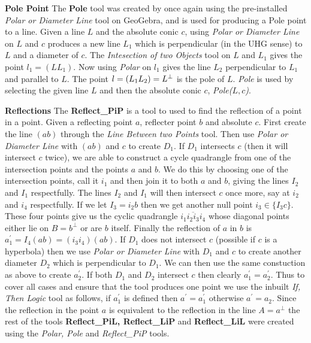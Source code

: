 \documentclass{unswthesis}
\begin{document}
\textbf{Pole Point}\newline
The \textbf{Pole} tool was created by once again using the pre-installed 
\textit{Polar or Diameter Line} tool on GeoGebra, and is used for producing
a Pole point to a line. Given a line $L$ and the absolute conic $c$, using 
\textit{Polar or Diameter Line} on $L$ and $c$ produces a new line $L_{1}$
which is perpendicular (in the UHG sense) to $L$ and a diameter of $c$. The 
\textit{Intesection of two Objects} tool on $L$ and $L_{1}$ gives the point $%
l_{1}=(LL_{1})$. Now using \textit{Polar} on $l_{1}$ gives the line $L_{2}$
perpendicular to $L_{1}$ and parallel to $L$. The point $l=(L_{1}L_{2})=L^{%
\perp}$ is the pole of $L$.\newline
\textit{Pole} is used by selecting the given line $L$ and then the absolute
conic $c$, \textit{Pole($L,c$)}.\newline

\textbf{Reflections}\newline
The \textbf{Reflect\_PiP} is a tool to used to find the reflection of a
point in a point. Given a reflecting point $a$, reflecter point $b$ and
absolute $c$. First create the line $(ab)$ through the \textit{Line Between
two Points} tool. Then use \textit{Polar or Diameter Line} with $(ab)$ and $%
c $ to create $D_{1}$. If $D_{1}$ intersects $c$ (then it will intersect $c$
twice), we are able to construct a cycle quadrangle from one of the
intersection points and the points $a$ and $b$. We do this by choosing one
of the intersection points, call it $i_{1}$ and then join it to both $a$ and 
$b$, giving the lines $I_{2}$ and $I_{1}$ respectfully. The lines $I_{2}$
and $I_{1}$ will then intersect $c$ once more, say at $i_{2}$ and $i_{4}$
respectfully. If we let $I_{3}=i_{2}b$ then we get another null point $%
i_{3}\in \{I_{3}c\}$. These four points give us the cyclic quadrangle $%
\overline{i_{1}i_{2}i_{3}i_{4}}$ whose diagonal points either lie on $%
B=b^{\perp }$ or are $b$ itself. Finally the reflection of $a$ in $b$ is $%
a_{1}^{\prime }=I_{4}(ab)=(i_{3}i_{4})(ab)$.\newline
If $D_{1}$ does not intersect $c$ (possible if $c$ is a hyperbola) then we
use \textit{Polar or Diameter Line} with $D_{1}$ and $c$ to create another
diameter $D_{2}$ which is perpendicular to $D_{1}$. We can then use the same
constuction as above to create $a_{2}^{\prime }$.\newline
If both $D_{1}$ and $D_{2}$ intersect $c$ then clearly $a_{1}^{\prime
}=a_{2}^{\prime }$. Thus to cover all cases and ensure that the tool
produces one point we use the inbuilt \textit{If, Then Logic} tool as
follows, if $a_{1}^{\prime }$ is defined then $a^{\prime }=a_{1}^{\prime }$
otherwise $a^{\prime }=a_{2}$.\newline
Since the reflection in the point $a$ is equivalent to the reflection in the
line $A=a^{\perp }$ the rest of the tools \textbf{Reflect\_PiL, Reflect\_LiP}
and \textbf{Reflect\_LiL} were created using the \textit{Polar, Pole} and 
\textit{Reflect\_PiP} tools.
\end{document}
